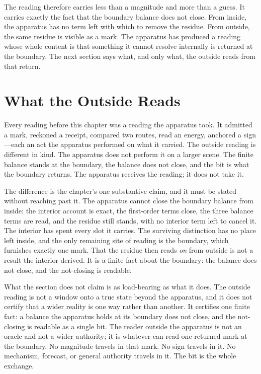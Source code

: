 The reading therefore carries less than a magnitude and more than a guess. It carries exactly the
fact that the boundary balance does not close. From inside, the apparatus has no term left with
which to remove the residue. From outside, the same residue is visible as a mark. The apparatus has
produced a reading whose whole content is that something it cannot resolve internally is returned
at the boundary. The next section says what, and only what, the outside reads from that return.

\section{What the Outside Reads}

Every reading before this chapter was a reading the apparatus took. It admitted a mark, reckoned
a receipt, compared two routes, read an energy, anchored a sign---each an act the apparatus
performed on what it carried. The outside reading is different in kind. The apparatus does not
perform it on a larger scene. The finite balance stands at the boundary, the balance does not
close, and the bit is what the boundary returns. The apparatus receives the reading; it does not
take it.

The difference is the chapter's one substantive claim, and it must be stated without reaching past
it. The apparatus cannot close the boundary balance from inside: the interior account is exact, the
first-order terms close, the three balance terms are read, and the residue still stands, with no
interior term left to cancel it. The interior has spent every slot it carries. The surviving
distinction has no place left inside, and the only remaining site of reading is the boundary, which
furnishes exactly one mark. That the residue then reads \emph{on} from outside is not a result the
interior derived. It is a finite fact about the boundary: the balance does not close, and the
not-closing is readable.

What the section does not claim is as load-bearing as what it does. The outside reading is not a
window onto a true state beyond the apparatus, and it does not certify that a wider reality is one
way rather than another. It certifies one finite fact: a balance the apparatus holds at its boundary
does not close, and the not-closing is readable as a single bit. The reader outside the apparatus is
not an oracle and not a wider authority; it is whatever can read one returned mark at the boundary.
No magnitude travels in that mark. No sign travels in it. No mechanism, forecast, or general
authority travels in it. The bit is the whole exchange.

